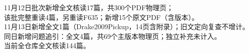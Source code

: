 11月12日批次新增全文核读17篇，共300个PDF物理页；\\[5pt]
该批完整重读4篇，另重读F635；新增15个原文PDF（含版本）。\\[5pt]
11月13日新增全文1篇（Drake2009Pickup，14页含附录）；旧文定向复查不增计。\\[5pt]
同日新增问题追引：全文4篇，共69个主版本物理页；独立补充未计入。\\[5pt]
当前全仓库全文核读144篇。
